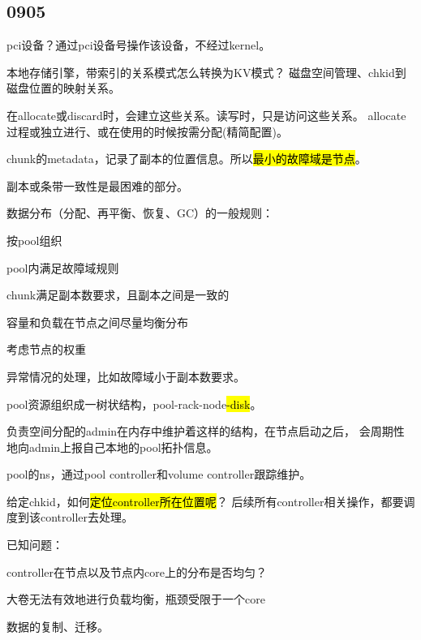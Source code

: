 \subsection{0905}

pci设备？通过pci设备号操作该设备，不经过kernel。

本地存储引擎，带索引的关系模式怎么转换为KV模式？
磁盘空间管理、chkid到磁盘位置的映射关系。

在allocate或discard时，会建立这些关系。读写时，只是访问这些关系。
allocate过程或独立进行、或在使用的时候按需分配(精简配置)。

chunk的metadata，记录了副本的位置信息。所以\hl{最小的故障域是节点}。

副本或条带一致性是最困难的部分。

数据分布（分配、再平衡、恢复、GC）的一般规则：
\begin{enumbox}
\item 按pool组织
\item pool内满足故障域规则
\item chunk满足副本数要求，且副本之间是一致的
\item 容量和负载在节点之间尽量均衡分布
\item 考虑节点的权重
\end{enumbox}

异常情况的处理，比如故障域小于副本数要求。

pool资源组织成一树状结构，pool-rack-node\hl{-disk}。

负责空间分配的admin在内存中维护着这样的结构，在节点启动之后，
会周期性地向admin上报自己本地的pool拓扑信息。

pool的ns，通过pool controller和volume controller跟踪维护。

给定chkid，如何\hl{定位controller所在位置呢}？
后续所有controller相关操作，都要调度到该controller去处理。

已知问题：
\begin{enumbox}
\item controller在节点以及节点内core上的分布是否均匀？
\item 大卷无法有效地进行负载均衡，瓶颈受限于一个core
\end{enumbox}

数据的复制、迁移。
